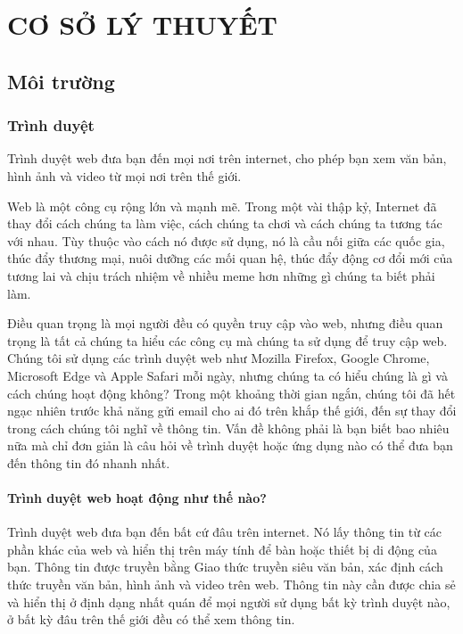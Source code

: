 \documentclass[11pt]{report}
\begin{document}
	\chapter{CƠ SỞ LÝ THUYẾT}
	\section{Môi trường}
	
	\subsection{Trình duyệt \cite{web:browser:what}} \label{subsection:webclient}
	Trình duyệt web đưa bạn đến mọi nơi trên internet, cho phép bạn xem văn bản, hình ảnh và video từ mọi nơi trên thế giới.
	
	Web là một công cụ rộng lớn và mạnh mẽ. Trong một vài thập kỷ, Internet đã thay đổi cách chúng ta làm việc, cách chúng ta chơi và cách chúng ta tương tác với nhau. Tùy thuộc vào cách nó được sử dụng, nó là cầu nối giữa các quốc gia, thúc đẩy thương mại, nuôi dưỡng các mối quan hệ, thúc đẩy động cơ đổi mới của tương lai và chịu trách nhiệm về nhiều meme hơn những gì chúng ta biết phải làm.
	
	Điều quan trọng là mọi người đều có quyền truy cập vào web, nhưng điều quan trọng là tất cả chúng ta hiểu các công cụ mà chúng ta sử dụng để truy cập web. Chúng tôi sử dụng các trình duyệt web như Mozilla Firefox, Google Chrome, Microsoft Edge và Apple Safari mỗi ngày, nhưng chúng ta có hiểu chúng là gì và cách chúng hoạt động không? Trong một khoảng thời gian ngắn, chúng tôi đã hết ngạc nhiên trước khả năng gửi email cho ai đó trên khắp thế giới, đến sự thay đổi trong cách chúng tôi nghĩ về thông tin. Vấn đề không phải là bạn biết bao nhiêu nữa mà chỉ đơn giản là câu hỏi về trình duyệt hoặc ứng dụng nào có thể đưa bạn đến thông tin đó nhanh nhất.
	
	
	\subsubsection{Trình duyệt web hoạt động như thế nào?}
	Trình duyệt web đưa bạn đến bất cứ đâu trên internet. Nó lấy thông tin từ các phần khác của web và hiển thị trên máy tính để bàn hoặc thiết bị di động của bạn. Thông tin được truyền bằng Giao thức truyền siêu văn bản, xác định cách thức truyền văn bản, hình ảnh và video trên web. Thông tin này cần được chia sẻ và hiển thị ở định dạng nhất quán để mọi người sử dụng bất kỳ trình duyệt nào, ở bất kỳ đâu trên thế giới đều có thể xem thông tin.
	
\end{document}
